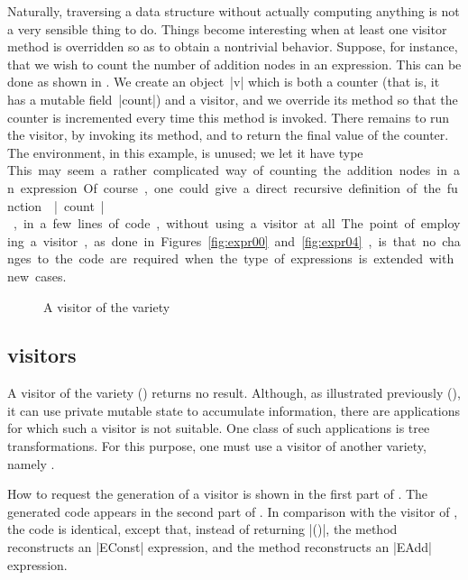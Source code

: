 \documentclass[onecolumn,11pt,nocopyrightspace]{sigplanconf}
\begin{document}
Naturally, traversing a data structure without actually computing anything is
not a very sensible thing to do. Things become interesting when at least one
visitor method is overridden so as to obtain a nontrivial behavior. Suppose,
for instance, that we wish to count the number of addition nodes in an
expression. This can be done as shown in . We create an
object~\oc|v| which is both a counter (that is, it has a mutable
field~\oc|count|) and a visitor, and we override its method
 so that the counter is incremented every time this
method is invoked. There remains to run the visitor, by invoking its
 method, and to return the final value of the counter. The
environment, in this example, is unused; we let it have type \unit.

This may seem a rather complicated way of counting the addition nodes in an
expression. Of course, one could give a direct recursive definition of the
function \oc|count|, in a few lines of code, without using a visitor at all.
The point of employing a visitor, as done in Figures~\ref{fig:expr00}
and~\ref{fig:expr04}, is that no changes to the code are required when the
type of expressions is extended with new cases.


\begin{figure}[t]
\vspace{-\baselineskip}
\caption{A visitor of the \map variety}
\label{fig:expr01}
\end{figure}

\subsection{\map visitors}
\label{sec:intro:map}

A visitor of the \iter variety () returns no result.
Although, as illustrated previously (), it can use
private mutable state to accumulate information, there are applications for
which such a visitor is not suitable. One class of such applications is tree
transformations. For this purpose, one must use a visitor of another variety,
namely \map.

How to request the generation of a \map visitor is shown in the first part of
. The generated code appears in the second part of
. In comparison with the \iter visitor of ,
the code is identical, except that, instead of returning \oc|()|, the method
 reconstructs an \oc|EConst| expression, and the method
 reconstructs an \oc|EAdd| expression.
\end{document}
